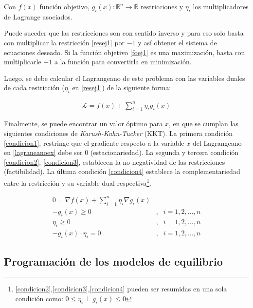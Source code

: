 Con $f(x)$ función objetivo,  $g_{i}(x):\mathbb{R}^n \rightarrow \mathbb{R}$ restricciones y $\eta_i$ los multiplicadores de Lagrange asociados. 
\vspace{2.5mm}

Puede suceder que las restricciones son con sentido inverso y para eso solo basta con multiplicar la restricción \ref{resej1} por $-1$ y así obtener el sistema de ecuaciones deseado. Si la función objetivo \ref{foej1} es una maximización, basta con multiplicarle $-1$ a la función para convertirla en minimización.
\vspace{2.5mm}

Luego, se debe calcular el Lagrangeano de este problema con las variables duales de cada restricción ($\eta_{i}$ en \ref{resej1}) de la siguiente forma:

\begin{align}
    \mathcal{L}=f(x) +  \sum_{i=1}^{n}\eta_{i}g_{i}(x)\label{lagraneanoex}
\end{align}

Finalmente, se puede encontrar un valor óptimo para $x$, en que se cumplan las siguientes condiciones de \textit{Karush-Kuhn-Tucker} (KKT). La primera condición \ref{condicion1}, restringe que el gradiente respecto a la variable $x$ del Lagrangeano en \ref{lagraneanoex} debe ser 0 (estacionariedad). La segunda y tercera condición \ref{condicion2}, \ref{condicion3}, establecen la no negatividad de las restricciones (factibilidad). La última condición \ref{condicion4} establece la complementariedad entre la restricción y su variable dual respectiva\footnote{\ref{condicion2},\ref{condicion3},\ref{condicion4} pueden ser resumidas en una sola condición como: $0\leq\eta_{i}\perp g_{i}(x)\leq 0$}. 

\begin{align}
    0 = \nabla f(x) + \sum_{i=1}^{n} \eta_{i}\nabla g_{i}(x) \label{condicion1}\\
    -g_{i}(x) \geq 0 &, & i=1,2,...,n  \label{condicion2}\\
    \eta_{i} \geq 0 &, & i=1,2,...,n \label{condicion3}\\
    -g_{i}(x)\cdot \eta_{i} = 0 &, & i=1,2,...,n \label{condicion4}
\end{align}

\subsection{Programación de los modelos de equilibrio}\label{explisolvers}

